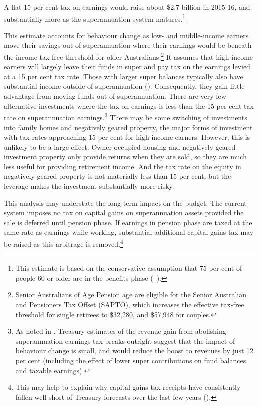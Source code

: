 \documentclass{grattanAlpha}
\begin{document}
A flat 15 per cent tax on earnings would raise about \$2.7 billion in 2015-16, and substantially more as the superannuation system matures.\footnote{This estimate is based on the conservative assumption that 75 per cent of people 60 or older are in the benefits phase (\gao\ \textcite{ABS2013t}).}

This estimate accounts for behaviour change as low- and middle-income earners move their savings out of superannuation where their earnings would be beneath the income tax-free threshold for older Australians.\footnote{Senior Australians of Age Pension age are eligible for the Senior Australian and Pensioners Tax Offset (SAPTO), which increases the effective tax-free threshold for single retirees to \$32,280, and \$57,948 for couples.}  It assumes that high-income earners will largely leave their funds in super and pay tax on the earnings levied at a 15 per cent tax rate. Those with larger super balances typically also have substantial income outside of superannuation (). Consequently, they gain little advantage from moving funds out of superannuation. There are very few alternative investments where the tax on earnings is less than the 15 per cent tax rate on superannuation earnings.\footnote{As noted in , Treasury estimates of the revenue gain from abolishing superannuation earnings tax breaks outright suggest that the impact of behaviour change is small, and would reduce the boost to revenues by just 12 per cent (including the effect of lower super contributions on fund balances and taxable earnings).}  There may be some switching of investments into family homes and negatively geared property, the major forms of investment with tax rates approaching 15 per cent for high-income earners. However, this is unlikely to be a large effect. Owner occupied housing and negatively geared investment property only provide returns when they are sold, so they are much less useful for providing retirement income. And the tax rate on the equity in negatively geared property is not materially less than 15 per cent, but the leverage makes the investment substantially more risky.  

This analysis may understate the long-term impact on the budget. The current system imposes no tax on capital gains on superannuation assets provided the sale is deferred until pension phase. If earnings in pension phase are taxed at the same rate as earnings while working, substantial additional capital gains tax may be raised as this arbitrage is removed.\footnote{This may help to explain why capital gains tax receipts have consistently fallen well short of Treasury forecasts over the last few years (\textcite[][51]{Treasury2012ReviewMacroRevenueForecasts}).}
\end{document}
